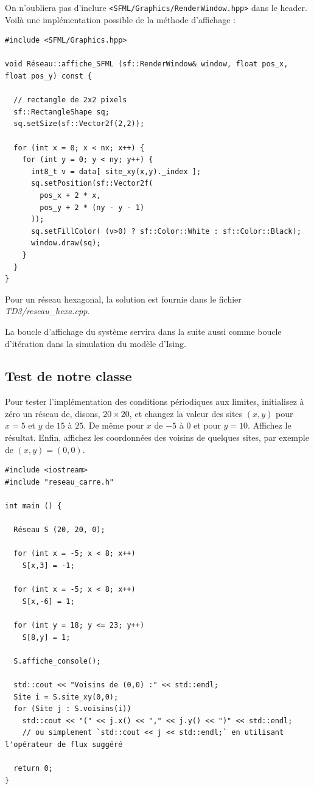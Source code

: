 \documentclass{book}
\newcommand{\inline}[1]{\texttt{#1}}
\def\filename{\emph}
\begin{document}
\begin{correction}
On n'oubliera pas d'inclure \inline{<SFML/Graphics/RenderWindow.hpp>} dans le header. Voilà une implémentation possible de la méthode d'affichage :
\begin{verbatim}
#include <SFML/Graphics.hpp>

void Réseau::affiche_SFML (sf::RenderWindow& window, float pos_x, float pos_y) const {

  // rectangle de 2x2 pixels
  sf::RectangleShape sq;
  sq.setSize(sf::Vector2f(2,2));

  for (int x = 0; x < nx; x++) {
    for (int y = 0; y < ny; y++) {
      int8_t v = data[ site_xy(x,y)._index ];
      sq.setPosition(sf::Vector2f(
        pos_x + 2 * x,
        pos_y + 2 * (ny - y - 1)
      ));
      sq.setFillColor( (v>0) ? sf::Color::White : sf::Color::Black);
      window.draw(sq);
    }
  }
}
\end{verbatim}

Pour un réseau hexagonal, la solution est fournie dans le fichier \filename{TD3/reseau\_hexa.cpp}.
\end{correction}

La boucle d'affichage du système servira dans la suite aussi comme boucle d'itération dans la simulation du modèle d'Ising.

\subsection{Test de notre classe}

Pour tester l'implémentation des conditions périodiques aux limites, initialisez à zéro un réseau de, disons, $20\times 20$, et changez la valeur des sites $(x,y)$ pour $x=5$ et $y$ de $15$ à $25$. De même pour $x$ de $-5$ à $0$ et pour $y=10$. Affichez le résultat. Enfin, affichez les coordonnées des voisins de quelques sites, par exemple de $(x,y)=(0,0)$.

\begin{correction}
\begin{verbatim}
#include <iostream>
#include "reseau_carre.h"

int main () {

  Réseau S (20, 20, 0);

  for (int x = -5; x < 8; x++) 
    S[x,3] = -1;

  for (int x = -5; x < 8; x++) 
    S[x,-6] = 1;
  
  for (int y = 18; y <= 23; y++) 
    S[8,y] = 1;
  
  S.affiche_console();

  std::cout << "Voisins de (0,0) :" << std::endl;
  Site i = S.site_xy(0,0);
  for (Site j : S.voisins(i))
    std::cout << "(" << j.x() << "," << j.y() << ")" << std::endl;
    // ou simplement `std::cout << j << std::endl;` en utilisant l'opérateur de flux suggéré

  return 0;
}
\end{verbatim}
\end{correction}
\end{document}
